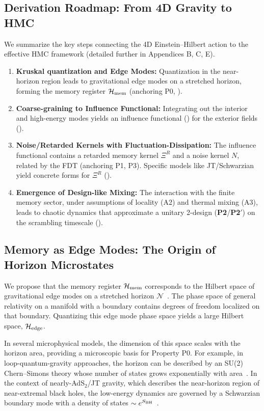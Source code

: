 \documentclass[aps,prd,preprint,onecolumn,superscriptaddress,nofootinbib,longbibliography,floatfix,11pt,showpacs,showkeys]{revtex4-2}
\newcommand{\Ptwo}{\textbf{P2}\xspace}
\newcommand{\PtwoPrime}{\textbf{P2$'$}\xspace}
\newcommand{\HMC}{\textsc{HMC}\xspace}
\theoremstyle{plain}
\theoremstyle{definition}
\theoremstyle{remark}
\begin{document}
\subsection{Derivation Roadmap: From 4D Gravity to HMC}
\label{sec:derivation_roadmap}
We summarize the key steps connecting the 4D Einstein--Hilbert action to the effective \HMC{} framework (detailed further in Appendices B, C, E).

\begin{enumerate}[label=(\roman*)]
    \item \textbf{Kruskal quantization and Edge Modes:} Quantization in the near-horizon region leads to gravitational edge modes on a stretched horizon, forming the memory register $\mathcal{H}_{\rm mem}$ (anchoring P0, ).
    \item \textbf{Coarse-graining to Influence Functional:} Integrating out the interior and high-energy modes yields an influence functional () for the exterior fields ().
    \item \textbf{Noise/Retarded Kernels with Fluctuation-Dissipation:} The influence functional contains a retarded memory kernel $\Xi^R$ and a noise kernel $N$, related by the FDT (anchoring P1, P3). Specific models like JT/Schwarzian yield concrete forms for $\Xi^R$ ().
  \item \textbf{Emergence of Design-like Mixing:} The interaction with the finite memory sector, under assumptions of locality (A2) and thermal mixing (A3), leads to chaotic dynamics that approximate a unitary 2-design (\Ptwo/\PtwoPrime) on the scrambling timescale ().
\end{enumerate}

\subsection{Memory as Edge Modes: The Origin of Horizon Microstates}
\label{sec:microstates}
We propose that the memory register $\mathcal{H}_{\rm mem}$ corresponds to the Hilbert space of gravitational edge modes on a stretched horizon $\mathcal{N}$~\cite{tHooft:1985, Susskind:1993, Donnelly:2016, Carlip:2017, HopfmullerFreidel:2018}. The phase space of general relativity on a manifold with a boundary contains degrees of freedom localized on that boundary. Quantizing this edge mode phase space yields a large Hilbert space, $\mathcal{H}_{\rm edge}$.

In several microphysical models, the dimension of this space scales with the horizon area, providing a microscopic basis for Property P0. For example, in loop-quantum-gravity approaches, the horizon can be described by an SU(2) Chern--Simons theory whose number of states grows exponentially with area~\cite{Ashtekar:1998, Engle:2010}. In the context of nearly-AdS$_2$/JT gravity, which describes the near-horizon region of near-extremal black holes, the low-energy dynamics are governed by a Schwarzian boundary mode with a density of states $\sim e^{S_{\rm BH}}$~\cite{Almheiri:2015, Maldacena:2016SYK, MSY:2016, Jensen:2016}.
\end{document}
